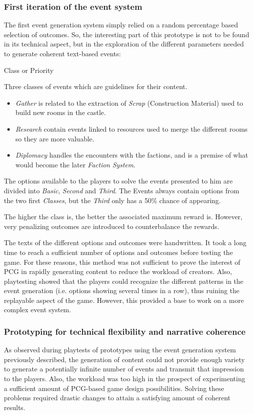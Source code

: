 \subsubsection{First iteration of the event system}
The first event generation system simply relied on a random percentage based selection of outcomes. So, the interesting part of this prototype is not to be found in its technical aspect, but in the exploration of the different parameters needed to generate coherent text-based events:
\begin{labeling}{Class or Priority}
\item[\textbf{Event Type}] Three classes of events which are guidelines for their content.
\begin{itemize}
\item \textit{Gather} is related to the extraction of \textit{Scrap} (Construction Material) used to build new rooms in the castle.
\item \textit{Research} contain events linked to resources  used to merge the different rooms so they are more valuable.
\item \textit{Diplomacy} handles the encounters with the factions, and is a premise of what would become the later \textit{Faction System}.
\end{itemize}
\item[\textbf{Option Class}] The options available to the players to solve the events presented to him are divided into \textit{Basic}, \textit{Second} and \textit{Third}. The Events always contain options from the two first \textit{Classes}, but the \textit{Third} only has a 50\% chance of appearing. 
\item[\textbf{Risk}] The higher the class is, the better the associated maximum reward is. However, very penalizing outcomes are introduced to counterbalance the rewards.
\end{labeling}
The texts of the different options and outcomes were handwritten. It took a long time to reach a sufficient number of options and outcomes before testing the game. For these reasons, this method was not sufficient to prove the interest of PCG in rapidly generating content to reduce the workload of creators. Also, playtesting showed that the players could recognize the different patterns in the event generation (i.e. options showing several times in a row), thus ruining the replayable aspect of the game. However, this provided a base to work on a more complex event system.
\subsubsection{Prototyping for technical flexibility and narrative coherence}
As observed during playtests of prototypes using the event generation system previously described, the generation of content could not provide enough variety to generate a potentially infinite number of events and transmit that impression to the players. Also, the workload was too high in the prospect of experimenting a sufficient amount of PCG-based game design possibilities. Solving these problems required drastic changes to attain a satisfying amount of coherent results.

